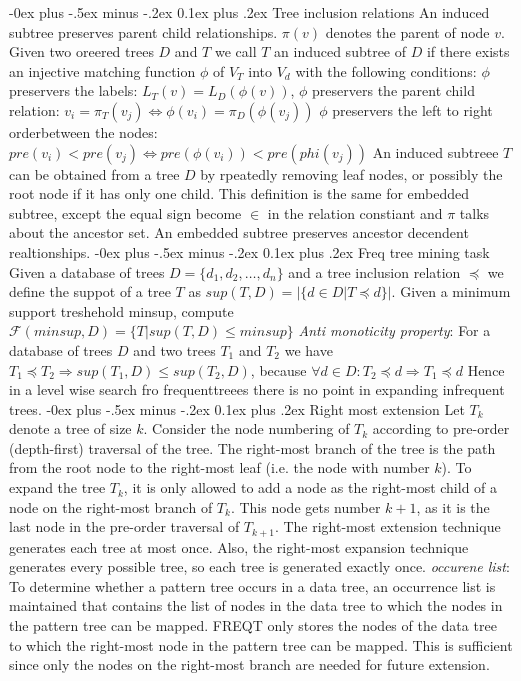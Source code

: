 \documentclass[8pt,landscape]{extarticle}
\makeatletter
\renewcommand{\subsubsection}{\@startsection{subsubsection}{3}{0mm}%
                                {-0ex plus -.5ex minus -.2ex}%
                                {0.1ex plus .2ex}%
                                {\normalfont\small\bfseries}}
\makeatother
\begin{document}
\begin{multicols}{3}
\subsubsection{Tree inclusion relations}
An induced subtree preserves parent child relationships.
$\pi(v)$ denotes the parent of node $v$.
Given two oreered trees $D$ and $T$ we call $T$ an induced subtree of $D$ if
there exists an injective matching function $\phi$ of $V_T$ into $V_d$ with the
following conditions: $\phi$ preservers the labels: $L_T(v)=L_D(\phi(v))$,
$\phi$ preservers the parent child relation:
$v_i = \pi_T(v_j)\Leftrightarrow \phi(v_i)=\pi_D(\phi(v_j))$
$\phi$ preservers the left to right orderbetween the nodes: $pre(v_i) <
pre(v_j ) \Leftrightarrow pre(\phi(v_i)) < pre(phi(v_j))$  
An induced subtreee $T$ can be obtained from a tree $D$ by rpeatedly removing
leaf nodes, or possibly the root node if it has only one child.
This definition is the same for embedded subtree, except the equal sign become
$\in$ in the relation constiant and $\pi$ talks about the ancestor set.
An embedded subtree preserves ancestor decendent realtionships. 
\subsubsection{Freq tree mining task}
Given a database of trees $D=\{d_1, d_2, \dots, d_n\}$ and a tree inclusion
relation $\preceq$ we define the suppot of a tree $T$ as
$sup(T,D)=|\{d\in D | T \preceq d\}|$. Given a minimum support treshehold
minsup, compute $\mathcal{F}(minsup,D)=\{T|sup(T,D)\leq minsup\}$
\emph{Anti monoticity property}: For a database of trees $D$ and two trees $T_1$
and $T_2$ we have $T_1 \preceq T_2 \Rightarrow sup(T_1, D) \leq sup(T_2, D)$,
because $\forall d \in D: T_2 \preceq d \Rightarrow T_1 \preceq d$
Hence in a level wise search fro frequenttreees there is no point in expanding
infrequent trees.
\subsubsection{Right most extension}
Let $T_k$ denote a tree of size $k$.
Consider the node numbering of $T_k$ according to pre-order (depth-first)
traversal of the tree.
The right-most branch of the tree is the path from the root node to the
right-most leaf (i.e. the node with number $k$).
To expand the tree $T_k$,
it is only allowed to add a node as the right-most child of a node on
the right-most branch of $T_k$.
This node gets number $k + 1$,
as it is the last node in the pre-order traversal of $T_{k+1}$.
The right-most extension technique generates each tree at most once.
Also, the right-most expansion technique generates every possible tree, so each
tree is generated exactly once.
\emph{occurene list}:
To determine whether a pattern tree occurs in a data tree, an occurrence list
is maintained that contains the list of nodes in the data tree to which the
nodes in the pattern tree can be mapped.
FREQT only stores the nodes of the data tree to which the right-most node in
the pattern tree can be mapped.
This is sufficient since only the nodes on the right-most branch are needed
for future extension.

\end{multicols}
\end{document}
